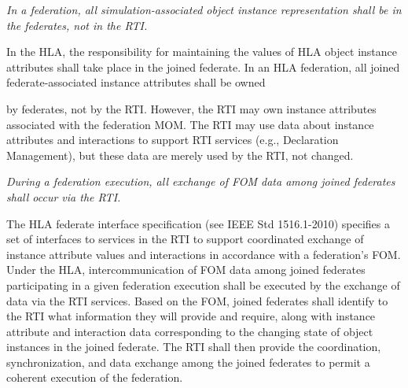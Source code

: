 \textit{In a federation, all simulation-associated object instance representation shall be in the federates, not in the\linebreak
RTI.}
\vspace{6pt}

In the HLA, the responsibility for maintaining the values of HLA object instance attributes shall take place\linebreak
in the joined federate. In an HLA federation, all joined federate-associated instance attributes shall be owned

\newpage

by federates, not by the RTI. However, the RTI may own instance attributes associated with the federation\linebreak
MOM. The RTI may use data about instance attributes and interactions to support RTI services (e.g.,\linebreak
Declaration Management), but these data are merely used by the RTI, not changed.


\textit{During a federation execution, all exchange of FOM data among joined federates shall occur via the RTI.}
\vspace{6pt}

The HLA federate interface specification (see IEEE Std 1516.1-2010) specifies a set of interfaces to services\linebreak
in the RTI to support coordinated exchange of instance attribute values and interactions in accordance with a\linebreak
federation's FOM. Under the HLA, intercommunication of FOM data among joined federates participating\linebreak
in a given federation execution shall be executed by the exchange of data via the RTI services. Based on the\linebreak
FOM, joined federates shall identify to the RTI what information they will provide and require, along with\linebreak
instance attribute and interaction data corresponding to the changing state of object instances in the joined\linebreak
federate. The RTI shall then provide the coordination, synchronization, and data exchange among the joined\linebreak
federates to permit a coherent execution of the federation.
\vspace{6pt}


